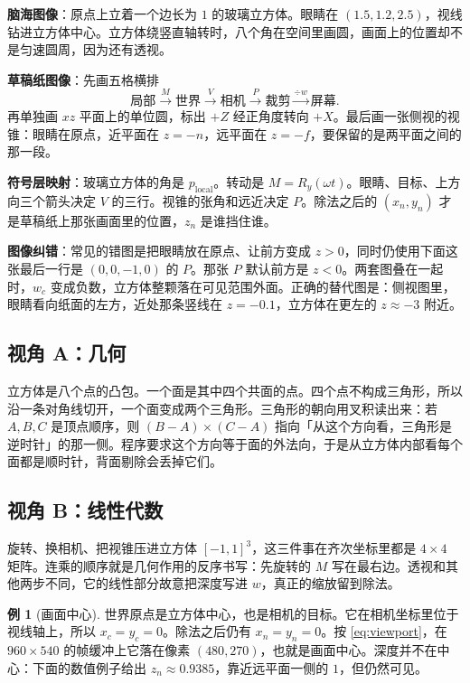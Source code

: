 \documentclass[12pt,a4paper]{article}
\theoremstyle{definition}
\newtheorem{example}{例}[section]
\theoremstyle{plain}
\theoremstyle{remark}
\begin{document}
\textbf{脑海图像}：原点上立着一个边长为 $1$ 的玻璃立方体。眼睛在 $(1.5,1.2,2.5)$，视线钻进立方体中心。立方体绕竖直轴转时，八个角在空间里画圆，画面上的位置却不是匀速圆周，因为还有透视。

\textbf{草稿纸图像}：先画五格横排
\[
\text{局部}\xrightarrow{M}\text{世界}\xrightarrow{V}\text{相机}\xrightarrow{P}\text{裁剪}\xrightarrow{\div w}\text{屏幕}.
\]
再单独画 $xz$ 平面上的单位圆，标出 $+Z$ 经正角度转向 $+X$。最后画一张侧视的视锥：眼睛在原点，近平面在 $z=-n$，远平面在 $z=-f$，要保留的是两平面之间的那一段。

\textbf{符号层映射}：玻璃立方体的角是 $p_{\mathrm{local}}$。转动是 $M=R_y(\omega t)$。眼睛、目标、上方向三个箭头决定 $V$ 的三行。视锥的张角和远近决定 $P$。除法之后的 $(x_n,y_n)$ 才是草稿纸上那张画面里的位置，$z_n$ 是谁挡住谁。

\textbf{图像纠错}：常见的错图是把眼睛放在原点、让前方变成 $z>0$，同时仍使用下面这张最后一行是 $(0,0,-1,0)$ 的 $P$。那张 $P$ 默认前方是 $z<0$。两套图叠在一起时，$w_c$ 变成负数，立方体整颗落在可见范围外面。正确的替代图是：侧视图里，眼睛看向纸面的左方，近处那条竖线在 $z=-0.1$，立方体在更左的 $z\approx -3$ 附近。

\subsection{视角 A：几何}

立方体是八个点的凸包。一个面是其中四个共面的点。四个点不构成三角形，所以沿一条对角线切开，一个面变成两个三角形。三角形的朝向用叉积读出来：若 $A,B,C$ 是顶点顺序，则 $(B-A)\times(C-A)$ 指向「从这个方向看，三角形是逆时针」的那一侧。程序要求这个方向等于面的外法向，于是从立方体内部看每个面都是顺时针，背面剔除会丢掉它们。

\subsection{视角 B：线性代数}

旋转、换相机、把视锥压进立方体 $[-1,1]^3$，这三件事在齐次坐标里都是 $4\times 4$ 矩阵。连乘的顺序就是几何作用的反序书写：先旋转的 $M$ 写在最右边。透视和其他两步不同，它的线性部分故意把深度写进 $w$，真正的缩放留到除法。

\begin{example}[画面中心]
世界原点是立方体中心，也是相机的目标。它在相机坐标里位于视线轴上，所以 $x_c=y_c=0$。除法之后仍有 $x_n=y_n=0$。按 \eqref{eq:viewport}，在 $960\times 540$ 的帧缓冲上它落在像素 $(480,270)$，也就是画面中心。深度并不在中心：下面的数值例子给出 $z_n\approx 0.9385$，靠近远平面一侧的 $1$，但仍然可见。
\end{example}
\end{document}

